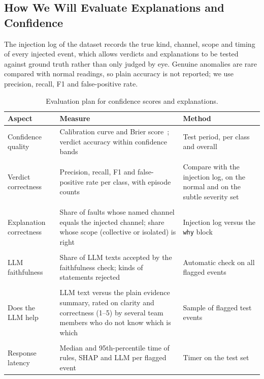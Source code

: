 \documentclass[11pt,a4paper]{article}
\begin{document}
\subsection{How We Will Evaluate Explanations and Confidence}
\label{sec:evaluation}
The injection log of the dataset records the true kind, channel, scope and timing of every injected event,
which allows verdicts and explanations to be tested against ground truth rather than only judged by eye.
Genuine anomalies are rare compared with normal readings, so plain accuracy is not reported; we use
precision, recall, F1 and false-positive rate.

\begin{table}[H]
\centering
\small
\begin{tabularx}{\textwidth}{@{}>{\raggedright\arraybackslash}p{3.1cm}LL@{}}
\toprule
\textbf{Aspect} & \textbf{Measure} & \textbf{Method} \\
\midrule
Confidence quality & Calibration curve and Brier score~\cite{trustcalpage}; verdict accuracy within confidence bands & Test period, per class and overall \\ \\
Verdict correctness & Precision, recall, F1 and false-positive rate per class, with episode counts & Compare with the injection log, on the normal and on the subtle severity set \\ \\
Explanation correctness & Share of faults whose named channel equals the injected channel; share whose scope (collective or isolated) is right & Injection log versus the \texttt{why} block \\ \\
LLM faithfulness & Share of LLM texts accepted by the faithfulness check; kinds of statements rejected & Automatic check on all flagged events \\ \\
Does the LLM help & LLM text versus the plain evidence summary, rated on clarity and correctness (1--5) by several team members who do not know which is which & Sample of flagged test events \\ \\
Response latency & Median and 95th-percentile time of rules, SHAP and LLM per flagged event & Timer on the test set \\
\bottomrule
\end{tabularx}
\caption{Evaluation plan for confidence scores and explanations.}
\label{tab:evalplan}
\end{table}
\end{document}
